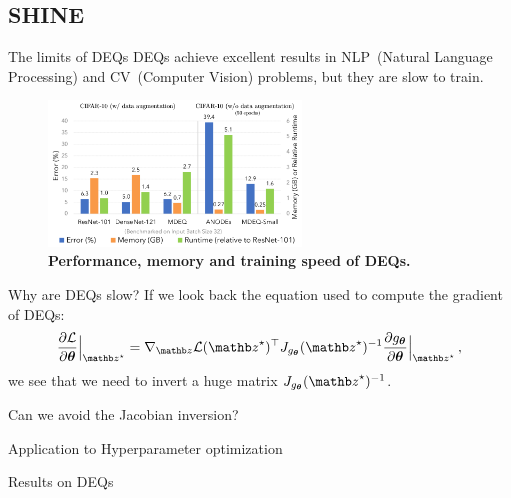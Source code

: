 \subsection{SHINE}
\begin{frame}{The limits of DEQs}
    DEQs achieve excellent results in NLP~(Natural Language Processing) and CV~(Computer Vision) problems, but they are slow to train.

    \begin{figure}
        \centering
        \includegraphics[width=0.6\textwidth]{Figures/shine_figures/deq_memory.png}
        \caption{\textbf{Performance, memory and training speed of DEQs.}~\citep{Bai2020MultiscaleModels}}
    \end{figure}
\end{frame}

\begin{frame}{Why are DEQs slow?}
    If we look back the equation used to compute the gradient of DEQs:
    \begin{equation*}
        \frac{\partial \mathcal{L}}{\partial \thetab}\Bigr|_{\zb^\star} = \nabla_\zb \mathcal{L}(\zb^\star)^\top J_{g_{\thetab}}(\zb^\star)^{-1} \frac{\partial g_{\thetab}}{\partial \thetab}\Bigr|_{\zb^\star} \, ,
    \end{equation*}
    we see that we need to invert a huge matrix $J_{g_{\thetab}}(\zb^\star)^{-1}$.
\end{frame}

\begin{frame}{Can we avoid the Jacobian inversion?}
\end{frame}

\begin{frame}{Application to Hyperparameter optimization}
\end{frame}

\begin{frame}{Results on DEQs}

\end{frame}